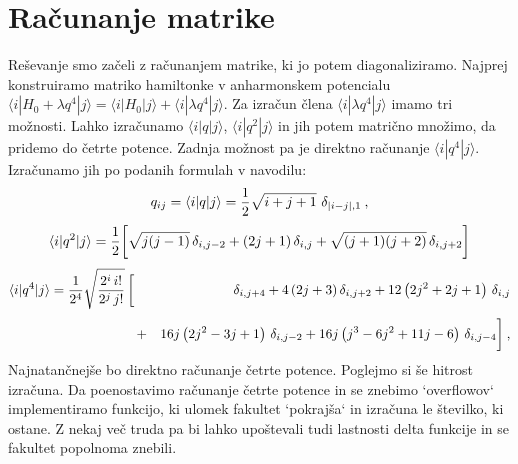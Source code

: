 \documentclass{article}
\begin{document}
\section{Računanje matrike}
Reševanje smo začeli z računanjem matrike, ki jo potem diagonaliziramo. Najprej konstruiramo matriko hamiltonke v anharmonskem potencialu 
$\langle i | H_0 + \lambda q^4 | j \rangle = \langle i | H_0 | j \rangle + \langle i | \lambda q^4 | j \rangle$.
Za izračun člena $\langle i | \lambda q^4 | j \rangle$ imamo tri možnosti. Lahko izračunamo $\langle i | q | j \rangle$, $\langle i | q^2 | j \rangle$ in jih potem matrično množimo, da pridemo do četrte potence. Zadnja možnost pa je direktno računanje $\langle i | q^4 | j \rangle$. Izračunamo jih po podanih formulah v navodilu:
\begin{equation*}
q_{ij} = \langle i | q | j \rangle
       = {1\over 2} \sqrt{i+j+1}\,\, \delta_{|i-j|,1} \>,
\end{equation*}
\begin{equation*}
\langle i|q^2|j\rangle
  = {1\over 2} \biggl[
    {\sqrt{j(j-1)}} \, \delta_{i,j-2}
  + {(2j+1)} \, \delta_{i,j}
  + {\sqrt{(j+1)(j+2)}} \, \delta_{i,j+2} \biggr]
\end{equation*}
\begin{eqnarray*}
\langle i|q^4|j\rangle
  = {1\over 2^4}\sqrt{2^i \, i!\over 2^{j} \, j! } \, \biggl[ \,
  &\,& \delta_{i,j+4} + 4\left(2j+3\right) \delta_{i,j+2}
                      + 12 \left(2j^2+2j+1\right) \, \delta_{i,j} \\[3pt]
  &+& 16j \left(2j^2-3j+1\right) \, \delta_{i,j-2}
     + 16j\left(j^3-6j^2+11j-6\right) \, \delta_{i,j-4} \biggr] \>,
\end{eqnarray*}
Najnatančnejše bo direktno računanje četrte potence. Poglejmo si še hitrost izračuna. Da poenostavimo računanje četrte potence in se znebimo `overflowov` implementiramo funkcijo, ki ulomek fakultet `pokrajša` in izračuna le številko, ki ostane. Z nekaj več truda pa bi lahko upoštevali tudi lastnosti delta funkcije in se fakultet popolnoma znebili.
\end{document}
